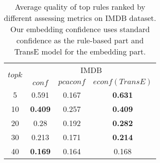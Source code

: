 \begin{table}[tbh]
\centering
\begin{tabular}{|c|c|c|c|} 
 \hline
 \multirow{2}{*}{$topk$} & \multicolumn{3}{|c|}{IMDB} \\
\cline{2-4}
 & $conf$ & $pcaconf$ & $econf(TransE)$ \\
 \hline
5 & 0.591 & 0.167 & \textbf{0.631} \\
10 & \textbf{0.409} & 0.257 & \textbf{0.409}\\
20 & 0.28 & 0.192 &\textbf{0.282} \\
30 & 0.213 & 0.171 & \textbf{0.214} \\
40 & \textbf{0.169} & 0.164 & 0.168 \\
 \hline
\end{tabular}
\newline
{}
\caption{Average quality of top rules ranked by different assessing metrics on IMDB dataset. Our embedding confidence uses standard confidence as the rule-based part and TransE model for the embedding part.}
\label{table:imdb_quality}
\end{table}
